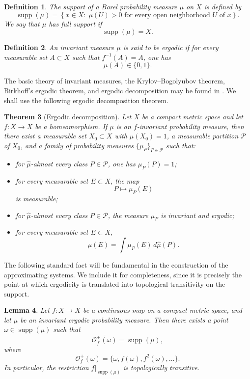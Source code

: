 \documentclass{amsart}
\numberwithin{equation}{section}
\newtheorem{theorem}{Theorem}[section]
\newtheorem{lemma}[theorem]{Lemma}
\newtheorem{definition}[theorem]{Definition}
\theoremstyle{remark}
\DeclareMathOperator{\supp}{supp}
\begin{document}
\begin{definition}
The support of a Borel probability measure $\mu$ on $X$ is defined by
\[
\supp(\mu)=\left\{x\in X:\; \mu(U)>0 \text{ for every open neighborhood } U \text{ of } x\right\}.
\]
We say that $\mu$ has \emph{full support} if
\[
\supp(\mu)=X.
\]
\end{definition}

\begin{definition}
An invariant measure $\mu$ is said to be \emph{ergodic} if for every measurable set $A\subset X$ such that $f^{-1}(A)=A$, one has
\[
\mu(A)\in\{0,1\}.
\]
\end{definition}

The basic theory of invariant measures, the Krylov--Bogolyubov theorem, Birkhoff's ergodic theorem, and ergodic decomposition may be found in \cite{walters1982,viana2016foundations}. We shall use the following ergodic decomposition theorem.

\begin{theorem}[Ergodic decomposition]\label{thm:ergodic_decomposition}
Let $X$ be a compact metric space and let $f:X\to X$ be a homeomorphism. If $\mu$ is an $f$-invariant probability measure, then there exist a measurable set $X_0\subset X$ with $\mu(X_0)=1$, a measurable partition $\mathcal P$ of $X_0$, and a family of probability measures $\{\mu_P\}_{P\in\mathcal P}$ such that:
\begin{itemize}
    \item[(i)] for $\hat{\mu}$-almost every class $P\in\mathcal P$, one has $\mu_P(P)=1$;
    \item[(ii)] for every measurable set $E\subset X$, the map
    \[
    P\mapsto \mu_P(E)
    \]
    is measurable;
    \item[(iii)] for $\hat{\mu}$-almost every class $P\in\mathcal P$, the measure $\mu_P$ is invariant and ergodic;
    \item[(iv)] for every measurable set $E\subset X$,
    \[
    \mu(E)=\int \mu_P(E)\,d\hat{\mu}(P).
    \]
\end{itemize}
\end{theorem}

The following standard fact will be fundamental in the construction of the approximating systems. We include it for completeness, since it is precisely the point at which ergodicity is translated into topological transitivity on the support.

\begin{lemma}\label{lem:dense_orbit_support}
Let $f:X\to X$ be a continuous map on a compact metric space, and let $\mu$ be an invariant ergodic probability measure. Then there exists a point $\omega \in \supp(\mu)$ such that
\[
\overline{\mathcal O_f^+(\omega)}=\supp(\mu),
\]
where
\[
\mathcal O_f^+(\omega)=\{\omega,f(\omega),f^2(\omega),\dots\}.
\]
In particular, the restriction $f|_{\supp(\mu)}$ is topologically transitive.
\end{lemma}
\end{document}
